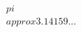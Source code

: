 \documentclass[preview]{standalone}
\begin{document}
\begin{align*}
\quad\\pi \quad\\approx 3.14159...
\end{align*}
\end{document}
